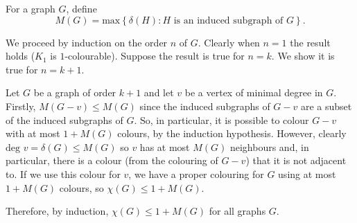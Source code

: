 For a graph $G$, define 
$$M(G) = \text{max}\left\{\delta(H): \text{$H$ is an induced subgraph of $G$} \right\}.$$

We proceed by induction on the order $n$ of $G$. Clearly when $n=1$ the
result holds ($K_1$ is $1$-colourable). Suppose the result is true for
$n=k$. We show it is true for $n=k+1$.

Let $G$ be a graph of order $k+1$ and let $v$ be a vertex of minimal degree in
$G$. Firstly, $M(G-v)\le M(G)$ since the induced subgraphs of $G-v$ are a subset of
the induced subgraphs of $G$. So, in particular, it is possible to colour $G-v$ with
at most $1+M(G)$ colours, by the induction hypothesis.  However, clearly
$\text{deg } v = \delta(G) \le M(G)$ so $v$ has at most $M(G)$ neighbours and,
in particular, there is a colour (from the colouring of $G-v$) that it is not
adjacent to. If we use this colour for $v$, we have a proper colouring for $G$ using
at most $1+M(G)$ colours, so $\chi(G) \le 1+M(G)$.

Therefore, by induction, $\chi(G) \le 1+M(G)$ for all graphs $G$.

